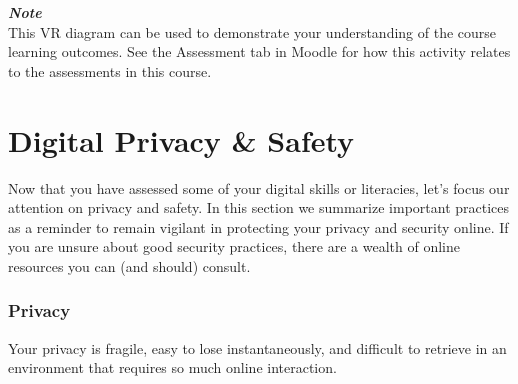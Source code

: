 \documentclass[
]{book}
\theoremstyle{definition}
\theoremstyle{definition}
\theoremstyle{definition}
\theoremstyle{definition}
\theoremstyle{remark}
\begin{document}
\begin{feedback}
\textbf{\emph{Note}}\\
This VR diagram can be used to demonstrate your understanding of the
course learning outcomes. See the Assessment tab in Moodle for how this
activity relates to the assessments in this course.
\end{feedback}

\hypertarget{digital-privacy-safety}{%
\section{Digital Privacy \& Safety}\label{digital-privacy-safety}}

Now that you have assessed some of your digital skills or literacies, let's focus our attention on privacy and safety. In this section we summarize important practices as a reminder to remain vigilant in protecting your privacy and security online. If you are unsure about good security practices, there are a wealth of online resources you can (and should) consult.

\hypertarget{privacy}{%
\subsubsection*{Privacy}\label{privacy}}

Your privacy is fragile, easy to lose instantaneously, and difficult to retrieve in an environment that requires so much online interaction.
\end{document}
